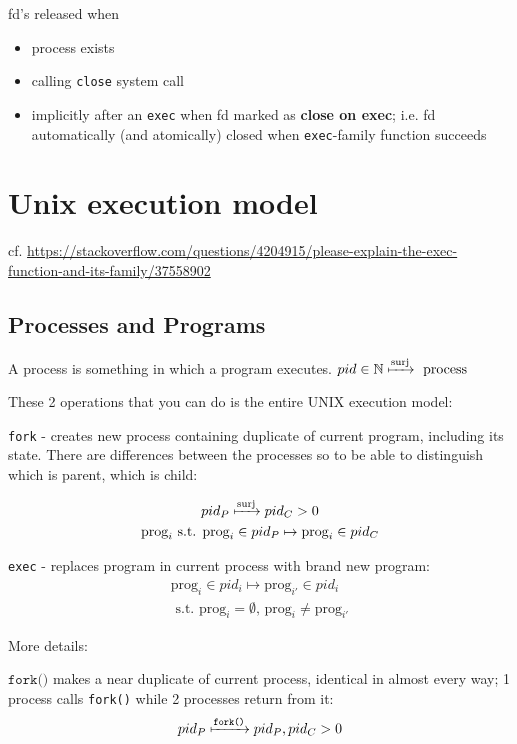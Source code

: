 \documentclass[10pt]{amsart}
\begin{document}
\begin{multicols*}{2}
fd's released when
\begin{itemize}
	\item process exists
	\item calling \texttt{close} system call
	\item implicitly after an \texttt{exec} when fd marked as \textbf{close on exec}; i.e. fd automatically (and atomically) closed when \texttt{exec}-family function succeeds
\end{itemize}

\section{Unix execution model}

cf. \url{https://stackoverflow.com/questions/4204915/please-explain-the-exec-function-and-its-family/37558902}

\subsection{Processes and Programs}

A process is something in which a program executes. $pid \in \mathbb{N} \xmapsto{\text{surj}} \text{ process }$

These 2 operations that you can do is the entire UNIX execution model:

\texttt{fork} - creates new process containing duplicate of current program, including its state. There are differences between the processes so to be able to distinguish which is parent, which is child:

\[
\begin{gathered}
	pid_P \xmapsto{\text{surj}} pid_C > 0 \\
	\text{prog}_i \text{ s.t. } \text{prog}_i \in pid_P \mapsto \text{prog}_i \in pid_C 
\end{gathered}
\]

\texttt{exec} - replaces program in current process with brand new program:
\[
\begin{gathered}
\text{prog}_i \in pid_i \mapsto \text{prog}_{i'} \in pid_i \\
\text{ s.t. } \text{prog}_i = \emptyset, \, \text{prog}_i \neq \text{prog}_{i'}
\end{gathered}
\]

More details:

$\texttt{fork()}$ makes a near duplicate of current process, identical in almost every way; 1 process calls \texttt{fork()} while 2 processes return from it:
\[
pid_P \xmapsto{\texttt{fork()}} pid_P, pid_C >0
\]


\end{multicols*}
\end{document}
